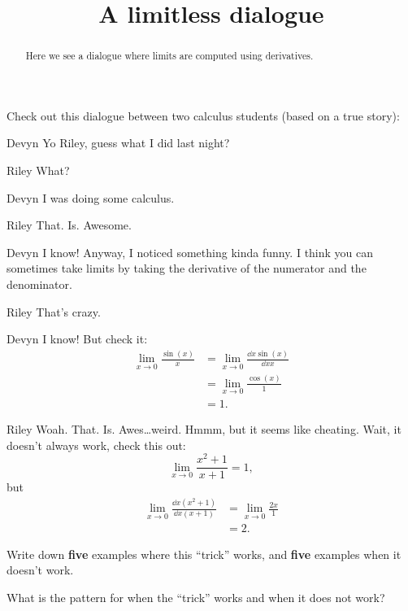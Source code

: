 \documentclass{ximera}
\title[Break-Ground:]{A limitless dialogue}
\begin{document}
\begin{abstract}
Here we see a dialogue where limits are computed using derivatives.
\end{abstract}
\maketitle

Check out this dialogue between two calculus students (based on a true
story):

\begin{dialogue}
\item[Devyn] Yo Riley, guess what I did last night?
\item[Riley] What?
\item[Devyn] I was doing some calculus.
\item[Riley] That. Is. Awesome.
\item[Devyn] I know! Anyway, I noticed something kinda funny. I
  think you can sometimes take limits by taking the derivative of the
  numerator and the denominator.
\item[Riley] That's crazy.
\item[Devyn] I know! But check it:
  \begin{align*}
    \lim_{x\to 0} \frac{\sin(x)}{x} &= \lim_{x\to 0} \frac{\dd{x}\sin(x)}{\dd{x}x}\\
    &= \lim_{x\to 0} \frac{\cos(x)}{1}\\
    &=1.
  \end{align*}
  \item[Riley] Woah. That. Is. Awes\dots weird. Hmmm, but it seems like
    cheating. Wait, it doesn't always work, check this out:
    \[
    \lim_{x\to 0} \frac{x^2+1}{x+1} = 1,
    \]
    but
    \begin{align*}
      \lim_{x\to 0} \frac{\dd{x}\left(x^2+1\right)}{\dd{x}\left(x+1\right)} &=
      \lim_{x\to 0} \frac{2x}{1} \\
      &=2.
    \end{align*}
\end{dialogue}

\begin{problem}
  Write down \textbf{five} examples where this ``trick'' works, and
  \textbf{five} examples when it doesn't work.
  \begin{freeResponse}
\end{freeResponse}
\end{problem}

\begin{problem}
  What is the pattern for when the ``trick'' works and when it does not work?
  \begin{freeResponse}
\end{freeResponse}
\end{problem}


\end{document}
